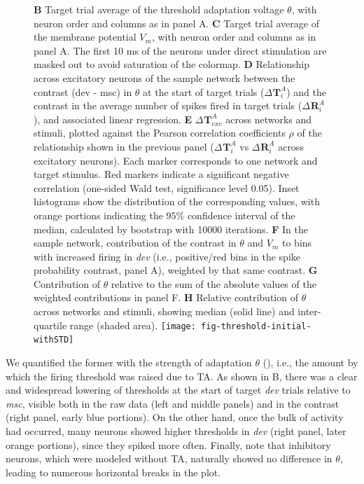\documentclass[9pt,lineno,onehalfspacing]{elife}
\newcommand{\dev}{\textit{dev}}
\newcommand{\msc}{\textit{msc}}
\newcommand{\R}[3][]{{}^{#1}_{}\boldsymbol R^{#2}_{#3}}
\newcommand{\T}[3][]{{}^{#1}_{}\boldsymbol T^{#2}_{#3}}
\begin{document}
\begin{figure}
{        \textbf{B} Target trial average of the threshold adaptation voltage $\theta$, with neuron order and columns as in panel A.
        \textbf{C} Target trial average of the membrane potential $V_m$, with neuron order and columns as in panel A. The first 10 ms of the neurons under direct stimulation are masked out to avoid saturation of the colormap.
        \textbf{D} Relationship across excitatory neurons of the sample network between the contrast (dev - msc) in $\theta$ at the start of target trials ($\Delta \T{A}{i}$) and the contrast in the average number of spikes fired in target trials ($\Delta \R{A}{i}$), and associated linear regression.
        \textbf{E} $\Delta \T{A}{exc}$ across networks and stimuli, plotted against the Pearson correlation coefficients $\rho$ of the relationship shown in the previous panel ($\Delta \T{A}{i}$ vs $\Delta \R{A}{i}$ across excitatory neurons). Each marker corresponds to one network and target stimulus. Red markers indicate a significant negative correlation (one-sided Wald test, significance level 0.05). Inset histograms show the distribution of the corresponding values, with orange portions indicating the 95\% confidence interval of the median, calculated by bootstrap with 10000 iterations.
        \textbf{F} In the sample network, contribution of the contrast in $\theta$ and $V_m$ to bins with increased firing in \dev{} (i.e., positive/red bins in the spike probability contrast, panel A), weighted by that same contrast.
        \textbf{G} Contribution of $\theta$ relative to the sum of the absolute values of the weighted contributions in panel F.
        \textbf{H} Relative contribution of $\theta$ across networks and stimuli, showing median (solid line) and inter-quartile range (shaded area).
    }
    {\texttt{[image: fig-threshold-initial-withSTD]}}\label{figsupp:withSTD}
\end{figure}

We quantified the former with the strength of adaptation $\theta$ (), i.e., the amount by which the firing threshold was raised due to TA. As shown in B, there was a clear and widespread lowering of thresholds at the start of target \dev{} trials relative to \msc{}, visible both in the raw data (left and middle panels) and in the contrast (right panel, early blue portions). On the other hand, once the bulk of activity had occurred, many neurons showed higher thresholds in \dev{} (right panel, later orange portions), since they spiked more often. Finally, note that inhibitory neurons, which were modeled without TA, naturally showed no difference in $\theta$, leading to numerous horizontal breaks in the plot.
\end{document}
